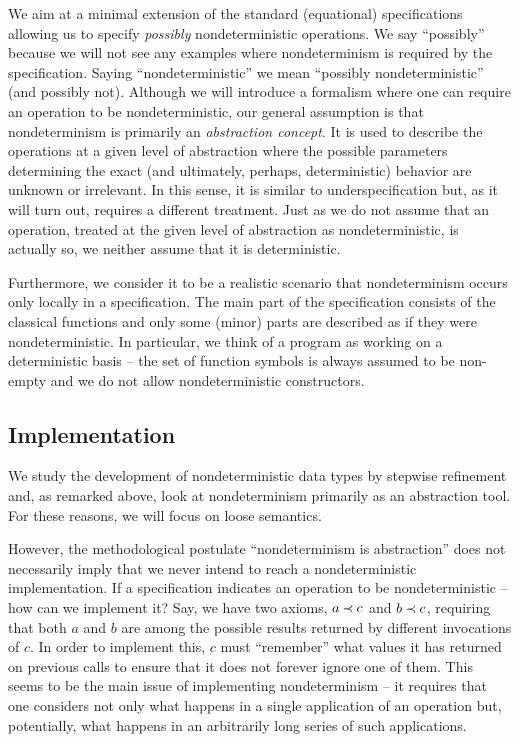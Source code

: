 We aim at a minimal extension of the standard (equational) specifications allowing
us to specify {\em possibly} nondeterministic operations. We say ``possibly'' because we will not see any examples where nondeterminism is required by the specification. Saying ``nondeterministic'' we mean ``possibly nondeterministic''
(and possibly not). Although we will introduce a formalism where 
one can
require an operation to be nondeterministic, our general assumption is that nondeterminism is primarily an {\em abstraction concept}. It is used to describe the operations at a given level of abstraction where the possible parameters determining the exact (and ultimately, perhaps, deterministic) behavior are unknown or irrelevant. In this sense, it is similar to underspecification but, as it will turn out, requires a different treatment. Just as we do not assume that an operation, treated at the given level of abstraction as nondeterministic, is actually so, we neither assume that it is deterministic.

Furthermore, we consider it to be a realistic scenario that nondeterminism occurs
only locally in a specification. The main part of the specification consists of the classical functions and only some (minor) parts are described as if
they were nondeterministic. In particular, we think of a program as working on a deterministic basis -- the set of function symbols is always assumed to be non-empty and we do not allow nondeterministic constructors. 

\subsection{Implementation}
We study the development of nondeterministic data types by stepwise refinement and, as remarked above, look at nondeterminism primarily as an abstraction tool. For these reasons, we will focus on loose semantics. 

However, the methodological postulate ``nondeterminism is abstraction'' does not necessarily imply that we never intend to reach a nondeterministic implementation.
If a specification indicates an operation to be nondeterministic -- how can we
implement
it? Say, we have two axioms, \(a\mathbin{\prec} c\) and \(b\mathbin{\prec} c\), requiring that both $a$ and $b$ are among the possible results returned by different invocations of $c$. In order to implement this, $c$ must ``remember'' what values
it has returned on previous calls to ensure that it does not forever ignore one of them. This seems to be the main issue of implementing nondeterminism -- it requires that one considers not only what happens in a single application of an operation but, potentially, what happens in an arbitrarily long series of such applications. 

